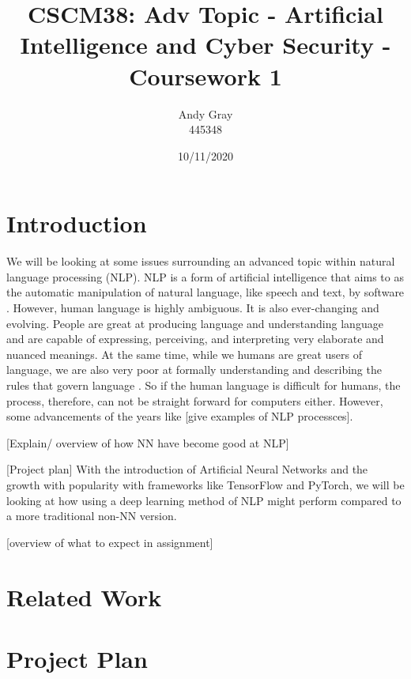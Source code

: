 \documentclass[a4paper,10pt]{article}
\begin{document}
\title{CSCM38: Adv Topic - Artificial Intelligence and Cyber Security - Coursework 1}
\author{Andy Gray\\445348}
\date{10/11/2020}

\maketitle

\section{Introduction}
\label{sec:intro}
	We will be looking at some issues surrounding an advanced topic within natural language processing (NLP).  NLP is a form of artificial intelligence that aims to as the automatic manipulation of natural language, like speech and text, by software \cite{nlp_definition}. However, human language is highly ambiguous. It is also ever-changing and evolving. People are great at producing language and understanding language and are capable of expressing, perceiving, and interpreting very elaborate and nuanced meanings. At the same time, while we humans are great users of language, we are also very poor at formally understanding and describing the rules that govern language \cite{goldberg2017neural}. So if the human language is difficult for humans, the process, therefore, can not be straight forward for computers either. However, some advancements of the years like [give examples of NLP processces].
	
	[Explain/ overview of how NN have become good at NLP]
	
	[Project plan] With the introduction of Artificial Neural Networks and the growth with popularity with frameworks like TensorFlow and PyTorch, we will be looking at how using a deep learning method of NLP might perform compared to a more traditional non-NN version.
	
	[overview of what to expect in assignment]

\section{Related Work}
\label{sec:related_work}



\section{Project Plan}
\label{sec:project_plan}


\medskip
\newpage
\begin{appendices}
	
	
\end{appendices}

\newpage



\end{document}

